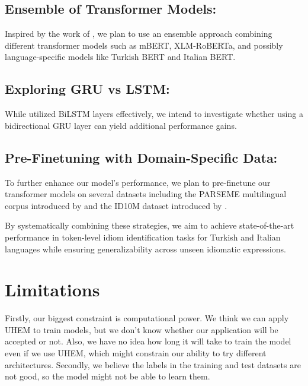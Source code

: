 \documentclass[11pt]{article}
\begin{document}
\subsection{Ensemble of Transformer Models:}
Inspired by the work of \citealp{Skvorc2022MICE}, we plan to use an ensemble approach combining different transformer models such as mBERT, XLM-RoBERTa, and possibly language-specific models like Turkish BERT \cite{turkishbert2023} and Italian BERT. 

\subsection{Exploring GRU vs LSTM: }
While \citeauthor{ID10M:2022} utilized BiLSTM layers effectively, we intend to investigate whether using a bidirectional GRU layer can yield additional performance gains.

\subsection{Pre-Finetuning with Domain-Specific Data:}
To further enhance our model's performance, we plan to pre-finetune our transformer models on several datasets including the PARSEME multilingual corpus introduced by \citealp{savary-etal-2017-parseme} and the ID10M dataset introduced by \citealp{ID10M:2022}.

By systematically combining these strategies, we aim to achieve state-of-the-art performance in token-level idiom identification tasks for Turkish and Italian languages while ensuring generalizability across unseen idiomatic expressions.
\section{Limitations}

Firstly, our biggest constraint is computational power. We think we can apply UHEM to train models, but we don't know whether our application will be accepted or not. Also, we have no idea how long it will take to train the model even if we use UHEM, which might constrain our ability to try different architectures. Secondly, we believe the labels in the training and test datasets are not good, so the model might not be able to learn them.







\end{document}
